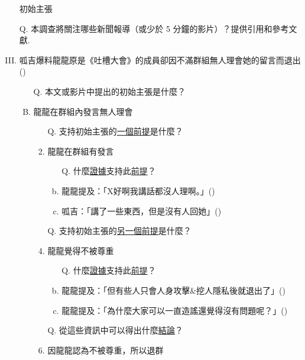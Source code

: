 \documentclass[a4paper, 12pt]{article}
\begin{document}
\begin{enumerate}[I.]
    \item []{\color{blue}初始主張}
    \item [Q.] 本調查將關注哪些新聞報導（或少於 5 分鐘的影片）？提供引用和參考文獻.
    \item 呱吉爆料龍龍原是《吐槽大會》的成員卻因不滿群組無人理會她的留言而退出 (\cite{2091301})
          \begin{enumerate}[A.]
              \item [Q.] 本文或影片中提出的{\color{blue}初始主張}是什麼？
              \item 龍龍在群組內發言無人理會
                    \begin{enumerate}[1.]
                        \item[Q.] 支持{\color{blue}初始主張}的{\underline{一個前提}}是什麼？
                        \item 龍龍在群組有發言
                              \begin{enumerate}[a.]
                                  \item [Q.] 什麼{\underline{證據}}支持此{\underline{前提}}？
                                  \item 龍龍提及：「X好啊我講話都沒人理啊。」(\cite{2091700})
                                  \item 呱吉：「講了一些東西，但是沒有人回她」(\cite{eFs8bNzDAHg7200s})
                              \end{enumerate}
                        \item [Q.] 支持{\color{blue}初始主張}的{\underline{另一個前提}}是什麼？
                        \item 龍龍覺得不被尊重
                              \begin{enumerate}[a.]
                                  \item [Q.] 什麼{\underline{證據}}支持此{\underline{前提}}？
                                  \item 龍龍提及：「但有些人只會人身攻擊\&挖人隱私後就退出了」(\cite{2778844612438695})
                                  \item 龍龍提及：「為什麼大家可以一直造謠還覺得沒有問題呢？」(\cite{2091700})
                              \end{enumerate}
                        \item [Q.] 從這些資訊中可以得出什麼{\underline{結論}}？
                        \item 因龍龍認為不被尊重，所以退群

\end{enumerate}
\end{enumerate}
\end{enumerate}
\end{document}

